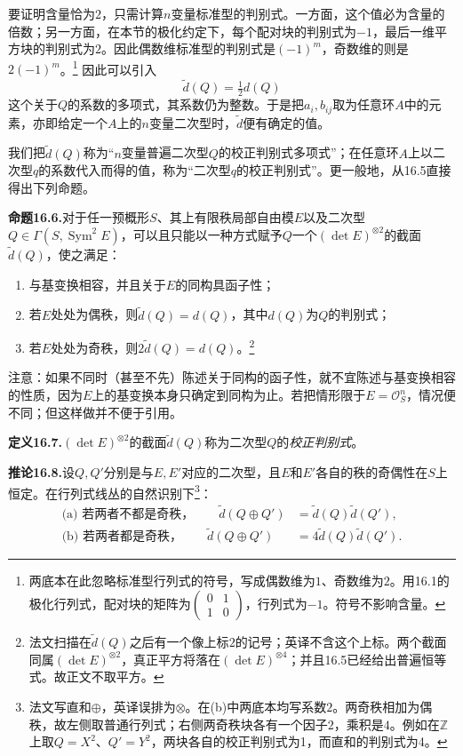 \documentclass[openany,fontset=fandol]{ctexbook}
\newcommand{\OO}{\mathcal O}
\DeclareMathOperator{\Sym}{Sym}
\begin{document}
要证明含量恰为$2$，只需计算$n$变量标准型的判别式。一方面，这个值必为含量的倍数；另一方面，在本节的极化约定下，每个配对块的判别式为$-1$，最后一维平方块的判别式为$2$。因此偶数维标准型的判别式是$(-1)^m$，奇数维的则是$2(-1)^m$。\footnote{两底本在此忽略标准型行列式的符号，写成偶数维为$1$、奇数维为$2$。用16.1的极化行列式，配对块的矩阵为$\left(\begin{smallmatrix}0&1\\1&0\end{smallmatrix}\right)$，行列式为$-1$。符号不影响含量。} 因此可以引入
\[
\widetilde d(Q)=\tfrac12 d(Q)
\]
这个关于$Q$的系数的多项式，其系数仍为整数。于是把$a_i,b_{ij}$取为任意环$A$中的元素，亦即给定一个$A$上的$n$变量二次型时，$\widetilde d$便有确定的值。

我们把$\widetilde d(Q)$称为“$n$变量普遍二次型$Q$的校正判别式多项式”；在任意环$A$上以二次型$q$的系数代入而得的值，称为“二次型$q$的校正判别式”。更一般地，从16.5直接得出下列命题。

\noindent\textbf{命题16.6.}\quad 对于任一预概形$S$、其上有限秩局部自由模$E$以及二次型$Q\in\Gamma(S,\Sym^2 E)$，可以且只能以一种方式赋予$Q$一个$(\det E)^{\otimes2}$的截面$\widetilde d(Q)$，使之满足：
\begin{enumerate}
\renewcommand{\labelenumi}{(\alph{enumi})}
\item 与基变换相容，并且关于$E$的同构具函子性；
\item 若$E$处处为偶秩，则$\widetilde d(Q)=d(Q)$，其中$d(Q)$为$Q$的判别式；
\item 若$E$处处为奇秩，则$2\widetilde d(Q)=d(Q)$。\footnote{法文扫描在$\widetilde d(Q)$之后有一个像上标$2$的记号；英译不含这个上标。两个截面同属$(\det E)^{\otimes2}$，真正平方将落在$(\det E)^{\otimes4}$；并且16.5已经给出普遍恒等式。故正文不取平方。}
\end{enumerate}

注意：如果不同时（甚至不先）陈述关于同构的函子性，就不宜陈述与基变换相容的性质，因为$E$上的基变换本身只确定到同构为止。若把情形限于$E=\OO_S^n$，情况便不同；但这样做并不便于引用。

\noindent\textbf{定义16.7.}\quad $(\det E)^{\otimes2}$的截面$\widetilde d(Q)$称为二次型$Q$的\emph{校正判别式}。

\noindent\textbf{推论16.8.}\quad 设$Q,Q'$分别是与$E,E'$对应的二次型，且$E$和$E'$各自的秩的奇偶性在$S$上恒定。在行列式线丛的自然识别下\footnote{法文写直和$\oplus$，英译误排为$\otimes$。在(b)中两底本均写系数$2$。两奇秩相加为偶秩，故左侧取普通行列式；右侧两奇秩块各有一个因子$2$，乘积是$4$。例如在$\mathbb Z$上取$Q=X^2$、$Q'=Y^2$，两块各自的校正判别式为1，而直和的判别式为4。}：
\begin{align*}
\text{(a) 若两者不都是奇秩，}\qquad
\widetilde d(Q\oplus Q')&=\widetilde d(Q)\widetilde d(Q'),\\
\text{(b) 若两者都是奇秩，}\qquad
\widetilde d(Q\oplus Q')&=4\widetilde d(Q)\widetilde d(Q').
\end{align*}
\end{document}
